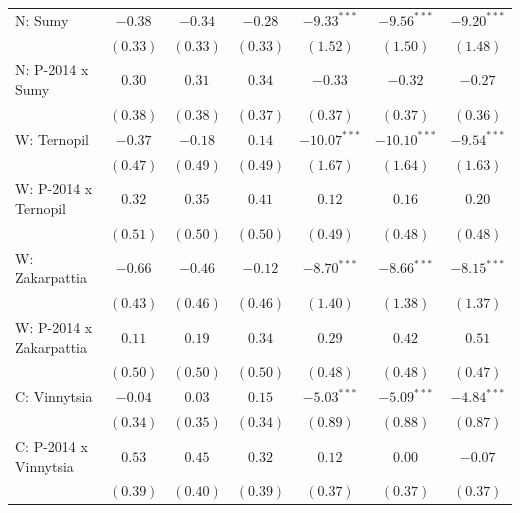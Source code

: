 \begin{table}
\begin{center}
\begin{small}
\begin{tabular}{l c c c c c c}
N: Sumy                     & $-0.38$       & $-0.34$     & $-0.28$        & $-9.33^{***}$  & $-9.56^{***}$  & $-9.20^{***}$  \\
                            & $(0.33)$      & $(0.33)$    & $(0.33)$       & $(1.52)$       & $(1.50)$       & $(1.48)$       \\
N: P-2014 x Sumy            & $0.30$        & $0.31$      & $0.34$         & $-0.33$        & $-0.32$        & $-0.27$        \\
                            & $(0.38)$      & $(0.38)$    & $(0.37)$       & $(0.37)$       & $(0.37)$       & $(0.36)$       \\
W: Ternopil                 & $-0.37$       & $-0.18$     & $0.14$         & $-10.07^{***}$ & $-10.10^{***}$ & $-9.54^{***}$  \\
                            & $(0.47)$      & $(0.49)$    & $(0.49)$       & $(1.67)$       & $(1.64)$       & $(1.63)$       \\
W: P-2014 x Ternopil        & $0.32$        & $0.35$      & $0.41$         & $0.12$         & $0.16$         & $0.20$         \\
                            & $(0.51)$      & $(0.50)$    & $(0.50)$       & $(0.49)$       & $(0.48)$       & $(0.48)$       \\
W: Zakarpattia              & $-0.66$       & $-0.46$     & $-0.12$        & $-8.70^{***}$  & $-8.66^{***}$  & $-8.15^{***}$  \\
                            & $(0.43)$      & $(0.46)$    & $(0.46)$       & $(1.40)$       & $(1.38)$       & $(1.37)$       \\
W: P-2014 x Zakarpattia     & $0.11$        & $0.19$      & $0.34$         & $0.29$         & $0.42$         & $0.51$         \\
                            & $(0.50)$      & $(0.50)$    & $(0.50)$       & $(0.48)$       & $(0.48)$       & $(0.47)$       \\
C: Vinnytsia                & $-0.04$       & $0.03$      & $0.15$         & $-5.03^{***}$  & $-5.09^{***}$  & $-4.84^{***}$  \\
                            & $(0.34)$      & $(0.35)$    & $(0.34)$       & $(0.89)$       & $(0.88)$       & $(0.87)$       \\
C: P-2014 x Vinnytsia       & $0.53$        & $0.45$      & $0.32$         & $0.12$         & $0.00$         & $-0.07$        \\
                            & $(0.39)$      & $(0.40)$    & $(0.39)$       & $(0.37)$       & $(0.37)$       & $(0.37)$       \\

\end{tabular}
\end{small}
\end{center}
\end{table}
